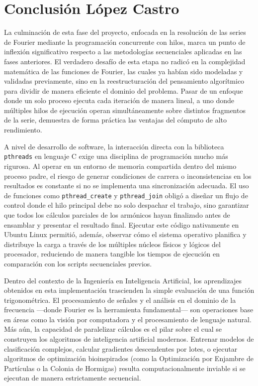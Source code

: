 \section*{Conclusión López Castro}

La culminación de esta fase del proyecto, enfocada en la resolución de las series de Fourier mediante la programación concurrente con hilos, marca un punto de inflexión significativo respecto a las metodologías secuenciales aplicadas en las fases anteriores. El verdadero desafío de esta etapa no radicó en la complejidad matemática de las funciones de Fourier, las cuales ya habían sido modeladas y validadas previamente, sino en la reestructuración del pensamiento algorítmico para dividir de manera eficiente el dominio del problema. Pasar de un enfoque donde un solo proceso ejecuta cada iteración de manera lineal, a uno donde múltiples hilos de ejecución operan simultáneamente sobre distintos fragmentos de la serie, demuestra de forma práctica las ventajas del cómputo de alto rendimiento.

A nivel de desarrollo de software, la interacción directa con la biblioteca \texttt{pthreads} en lenguaje C exige una disciplina de programación mucho más rigurosa. Al operar en un entorno de memoria compartida dentro del mismo proceso padre, el riesgo de generar condiciones de carrera o inconsistencias en los resultados es constante si no se implementa una sincronización adecuada. El uso de funciones como \texttt{pthread\_create} y \texttt{pthread\_join} obligó a diseñar un flujo de control donde el hilo principal debe no solo despachar el trabajo, sino garantizar que todos los cálculos parciales de los armónicos hayan finalizado antes de ensamblar y presentar el resultado final. Ejecutar este código nativamente en Ubuntu Linux permitió, además, observar cómo el sistema operativo planifica y distribuye la carga a través de los múltiples núcleos físicos y lógicos del procesador, reduciendo de manera tangible los tiempos de ejecución en comparación con los scripts secuenciales previos.

Dentro del contexto de la Ingeniería en Inteligencia Artificial, los aprendizajes obtenidos en esta implementación trascienden la simple evaluación de una función trigonométrica. El procesamiento de señales y el análisis en el dominio de la frecuencia —donde Fourier es la herramienta fundamental— son operaciones base en áreas como la visión por computadora y el procesamiento de lenguaje natural. Más aún, la capacidad de paralelizar cálculos es el pilar sobre el cual se construyen los algoritmos de inteligencia artificial modernos. Entrenar modelos de clasificación complejos, calcular gradientes descendentes por lotes, o ejecutar algoritmos de optimización bioinspirados (como la Optimización por Enjambre de Partículas o la Colonia de Hormigas) resulta computacionalmente inviable si se ejecutan de manera estrictamente secuencial. 

